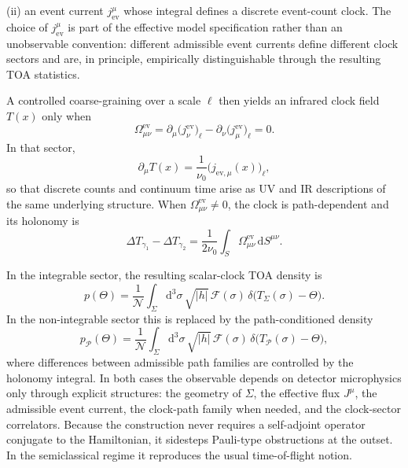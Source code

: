 \documentclass[pdflatex,sn-mathphys-num]{sn-jnl}
\theoremstyle{thmstylethree}
\theoremstyle{thmstyleone}
\theoremstyle{thmstyletwo}
\numberwithin{equation}{section}
\newcommand{\dd}{\mathrm{d}}
\begin{document}
    \noindent
    (ii) an event current $j^\mu_{\mathrm{ev}}$ whose integral defines a discrete event-count clock. The choice of $j^\mu_{\mathrm{ev}}$ is part of the effective model specification rather than an unobservable convention: different admissible event currents define different clock sectors and are, in principle, empirically distinguishable through the resulting TOA statistics.
    
    \smallskip
    A controlled coarse-graining over a scale $\ell$ then yields an infrared clock field $T(x)$ only when
    \begin{equation}
        \Omega^{\mathrm{ev}}_{\mu\nu}
        =
        \partial_\mu\big(j^{\mathrm{ev}}_\nu\big)_\ell
        -
        \partial_\nu\big(j^{\mathrm{ev}}_\mu\big)_\ell
        =0 .
    \end{equation}
    In that sector,
    \begin{equation}
        \partial_\mu T(x)=\frac{1}{\nu_0}\big(j_{\mathrm{ev},\mu}(x)\big)_\ell,
    \end{equation}
    so that discrete counts and continuum time arise as UV and IR descriptions of the same underlying structure. When $\Omega^{\mathrm{ev}}_{\mu\nu}\neq0$, the clock is path-dependent and its holonomy is
    \begin{equation}
        \Delta T_{\gamma_1}-\Delta T_{\gamma_2}
        =
        \frac{1}{2\nu_0}
        \int_S
        \Omega^{\mathrm{ev}}_{\mu\nu}\,\dd S^{\mu\nu} .
    \end{equation}
    
    In the integrable sector, the resulting scalar-clock TOA density is
    \begin{equation}
        p(\Theta)=
        \frac{1}{\mathcal{N}}
        \int_{\Sigma}\dd^3\sigma\,\sqrt{|h|}\,
        \mathcal{F}(\sigma)\,
        \delta\!\big(T_\Sigma(\sigma)-\Theta\big).
    \end{equation}
    In the non-integrable sector this is replaced by the path-conditioned density
    \begin{equation}
        p_{\mathcal{P}}(\Theta)=
        \frac{1}{\mathcal{N}}
        \int_{\Sigma}\dd^3\sigma\,\sqrt{|h|}\,
        \mathcal{F}(\sigma)\,
        \delta\!\big(T_{\mathcal{P}}(\sigma)-\Theta\big),
    \end{equation}
    where differences between admissible path families are controlled by the holonomy integral. In both cases the observable depends on detector microphysics only through explicit structures: the geometry of $\Sigma$, the effective flux $J^\mu$, the admissible event current, the clock-path family when needed, and the clock-sector correlators. Because the construction never requires a self-adjoint operator conjugate to the Hamiltonian, it sidesteps Pauli-type obstructions at the outset. In the semiclassical regime it reproduces the usual time-of-flight notion.
\end{document}

